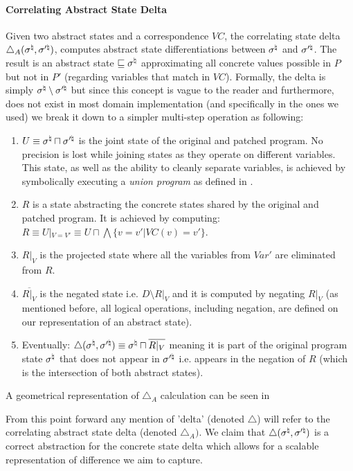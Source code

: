 \paragraph{Correlating Abstract State Delta} 
Given two abstract states and a correspondence $VC$,  the correlating state delta $\triangle_{A}(\sigma^\natural,\sigma'^\natural)$, computes abstract state differentiations between $\sigma^\natural$ and $\sigma'^\natural$. The result is an abstract state $\sqsubseteq \sigma^\natural$ approximating all concrete values possible in $P$ but not in $P'$ (regarding variables that match in $VC$). Formally, the delta is simply $\sigma^\natural \setminus \sigma'^\natural$ but since this concept is vague to the reader and furthermore, does not exist in most domain implementation (and specifically in the ones we used) we break it down to a simpler multi-step operation as following:
\begin{enumerate}
\item $U \equiv \sigma^\natural \sqcap \sigma'^\natural$ is the joint state of the original and patched program. No precision is lost while joining states as they operate on different variables. This state, as well as the ability to cleanly separate variables, is achieved by symbolically executing a \emph{union program} as defined in .
\item $R$ is a state abstracting the concrete states shared by the original and patched program. It is achieved by computing: $R \equiv U|_{V=V'} \equiv U \sqcap \bigwedge\{ v = v' | VC(v) = v'\}$.
\item $R|_V$ is the projected state where all the variables from $Var'$ are eliminated from $R$.
\item $\overline{R|_V}$ is the negated state i.e. $D \setminus R|_V$ and it is computed by negating $R|_V$ (as mentioned before, all logical operations, including negation, are defined on our representation of an abstract state).
\item Eventually: $\triangle(\sigma^\natural,\sigma'^\natural) \equiv \sigma^\natural \sqcap \overline{R|_V}$ meaning it is part of the original program state $\sigma^\natural$ that does not appear in $\sigma'^\natural$ i.e. appears in the negation of $R$ (which is the intersection of both abstract states).
\end{enumerate}


A geometrical representation of $\triangle_{A}$ calculation can be seen in \figref{}

From this point forward any mention of 'delta' (denoted $\triangle$) will refer to the correlating abstract state delta (denoted $\triangle_{A})$. We claim that $\triangle(\sigma^\natural,\sigma'^\natural)$ is a correct abstraction for the concrete state delta which allows for a scalable representation of difference we aim to capture.

